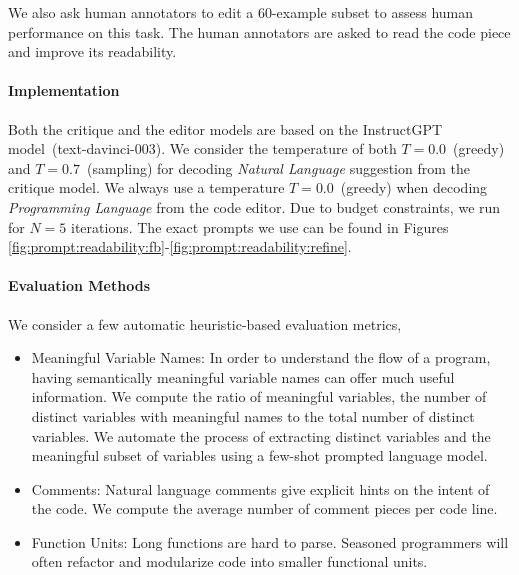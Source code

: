 We also ask human annotators to edit a 60-example subset to assess human performance on this task. The human annotators are asked to read the code piece and improve its readability. 

\paragraph{Implementation} Both the critique and the editor models are based on the InstructGPT model~(text-davinci-003). We consider the temperature of both $T=0.0$~(greedy) and $T=0.7$~(sampling) for decoding \emph{Natural Language} suggestion from the critique model. We always use a temperature $T=0.0$~(greedy) when decoding \emph{Programming Language} from the code editor. Due to budget constraints, we run \ours for  $N=5$ iterations. The exact prompts we use can be found in Figures \ref{fig:prompt:readability:fb}-\ref{fig:prompt:readability:refine}.

\paragraph{Evaluation Methods}
We consider a few automatic heuristic-based evaluation metrics,
\begin{itemize}
    \item Meaningful Variable Names: In order to understand the flow of a program, having semantically meaningful variable names can offer much useful information. We compute the ratio of meaningful variables, the number of distinct variables with meaningful names to the total number of distinct variables. We automate the process of extracting distinct variables and the meaningful subset of variables using a few-shot prompted language model.
    \item Comments: Natural language comments give explicit hints on the intent of the code. We compute the average number of comment pieces per code line.
    \item Function Units: Long functions are hard to parse. Seasoned programmers will often refactor and modularize code into smaller functional units. 
\end{itemize}

